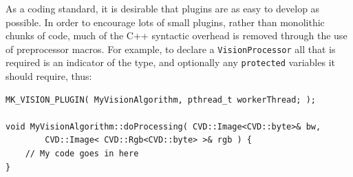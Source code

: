 \documentclass[a4paper,10pt]{article}
\begin{document}
As a coding standard, it is desirable that plugins are as easy to develop as possible. In order to encourage lots of small plugins, rather than monolithic chunks of code, much of the C++ syntactic overhead is removed through the use of preprocessor macros. For example, to declare a \texttt{VisionProcessor} all that is required is an indicator of the type, and optionally any \texttt{protected} variables it should require, thus:

\begin{verbatim}
MK_VISION_PLUGIN( MyVisionAlgorithm, pthread_t workerThread; );

void MyVisionAlgorithm::doProcessing( CVD::Image<CVD::byte>& bw, 
        CVD::Image< CVD::Rgb<CVD::byte> >& rgb ) {
    // My code goes in here
}
\end{verbatim}
\end{document}
